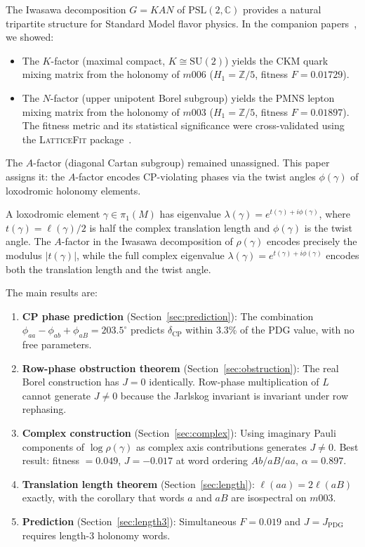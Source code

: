 ﻿\documentclass[epjc3]{svjour3}
\begin{document}
The Iwasawa decomposition $G = KAN$ of $\mathrm{PSL}(2,\mathbb{C})$
provides a natural tripartite structure for Standard Model flavor
physics.  In the companion papers~\cite{Gentry2026c,Gentry2026b}, we
showed:
\begin{itemize}
  \item The $K$-factor (maximal compact, $K \cong \mathrm{SU}(2)$)
    yields the CKM quark mixing matrix from the holonomy of $m006$
    ($H_1 = \mathbb{Z}/5$, fitness $F = 0.01729$).
  \item The $N$-factor (upper unipotent Borel subgroup) yields the
    PMNS lepton mixing matrix from the holonomy of $m003$
    ($H_1 = \mathbb{Z}/5$, fitness $F = 0.01897$).  The fitness
    metric and its statistical significance were cross-validated using
    the \textsc{LatticeFit} package~\cite{Gentry2026a}.
\end{itemize}

The $A$-factor (diagonal Cartan subgroup) remained unassigned.  This
paper assigns it: the $A$-factor encodes CP-violating phases via the
twist angles $\phi(\gamma)$ of loxodromic holonomy elements.

A loxodromic element $\gamma \in \pi_1(M)$ has eigenvalue
$\lambda(\gamma) = e^{t(\gamma)+i\phi(\gamma)}$, where
$t(\gamma) = \ell(\gamma)/2$ is half the complex translation length
and $\phi(\gamma)$ is the twist angle.  The $A$-factor in the Iwasawa
decomposition of $\rho(\gamma)$ encodes precisely the modulus
$|t(\gamma)|$, while the full complex eigenvalue
$\lambda(\gamma) = e^{t(\gamma)+i\phi(\gamma)}$ encodes both the
translation length and the twist angle.

The main results are:
\begin{enumerate}
  \item \textbf{CP phase prediction} (Section~\ref{sec:prediction}):
    The combination $\phi_{aa} - \phi_{ab} + \phi_{aB} = 203.5^\circ$
    predicts $\delta_{\mathrm{CP}}$ within 3.3\% of the PDG value,
    with no free parameters.
  \item \textbf{Row-phase obstruction theorem}
    (Section~\ref{sec:obstruction}): The real Borel construction has
    $J = 0$ identically.  Row-phase multiplication of $L$ cannot
    generate $J \neq 0$ because the Jarlskog invariant is invariant
    under row rephasing.
  \item \textbf{Complex construction} (Section~\ref{sec:complex}):
    Using imaginary Pauli components of $\log\rho(\gamma)$ as complex
    axis contributions generates $J \neq 0$.  Best result: fitness
    $= 0.049$, $J = -0.017$ at word ordering $Ab/aB/aa$, $\alpha = 0.897$.
  \item \textbf{Translation length theorem}
    (Section~\ref{sec:length}): $\ell(aa) = 2\ell(aB)$ exactly, with
    the corollary that words $a$ and $aB$ are isospectral on $m003$.
  \item \textbf{Prediction} (Section~\ref{sec:length3}): Simultaneous
    $F = 0.019$ and $J = J_{\mathrm{PDG}}$ requires length-3
    holonomy words.
\end{enumerate}
\end{document}
